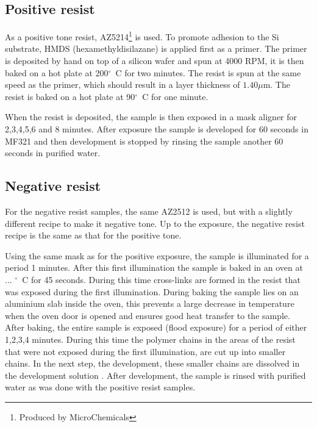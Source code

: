 \subsection*{Positive resist}
As a positive tone resist, AZ5214\footnote{Produced by MicroChemicals} is used. To promote adhesion to the Si substrate, HMDS (hexamethyldisilazane) is applied first as a primer. The primer is deposited by hand on top of a silicon wafer and spun at 4000 RPM, it is then baked on a hot plate at 200$^{\circ}$~C for two minutes. The resist is spun at the same speed as the primer, which should result in a layer thickness of $1.40 \mu$m. The resist is baked on a hot plate at 90$^{\circ}$~C for one minute.

When the resist is deposited, the sample is then exposed in a mask aligner for 2,3,4,5,6 and 8 minutes. After exposure the sample is developed for 60 seconds in MF321 and then development is stopped by rinsing the sample another 60 seconds in purified water.

\subsection*{Negative resist}
For the negative resist samples, the same AZ2512 is used, but with a slightly different recipe to make it negative tone. Up to the exposure, the negative resist recipe is the same as that for the positive tone. 

Using the same mask as for the positive exposure, the sample is illuminated for a period 1  minutes. After this first illumination the sample is baked in an oven at ...  $^\circ$~C for 45 seconds. During this time cross-links are formed in the resist that was exposed during the first illumination. During baking the sample lies on an aluminium slab inside the oven, this prevents a large decrease in temperature when the oven door is opened and ensures good heat transfer to the sample. After baking, the entire sample is exposed (flood exposure) for a period of either 1,2,3,4  minutes. During this time the polymer chains in the areas of the resist that were not exposed during the first illumination, are cut up into smaller chains. In the next step, the development, these smaller chains are dissolved in the development solution . After development, the sample is rinsed with purified water as was done with the positive resist samples.